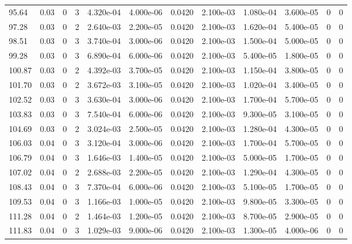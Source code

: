 \documentclass[preview]{standalone}
\begin{document}
{{{{\begin{tabular}{L{1.2cm}C{1.2cm} C{0.3cm}C{0.5cm} C{1.4cm}C{1.4cm} C{1.4cm}C{1.4cm} C{1.6cm}C{1.6cm} C{1.6cm}C{1.6cm}}
  95.64  &  0.03  & 0     &  3 &  4.320e-04  & 4.000e-06  &  0.0420&   2.100e-03& 1.080e-04 & 3.600e-05   &  0 & 0  \\ 
  97.28  &  0.03  & 0     &  2 &  2.640e-03  & 2.200e-05  &  0.0420&   2.100e-03& 1.620e-04 & 5.400e-05   &  0 & 0  \\ 
  98.51  &  0.03  & 0     &  3 &  3.740e-04  & 3.000e-06  &  0.0420&   2.100e-03& 1.500e-04 & 5.000e-05   &  0 & 0  \\ 
  99.28  &  0.03  & 0     &  3 &  6.890e-04  & 6.000e-06  &  0.0420&   2.100e-03& 5.400e-05 & 1.800e-05   &  0 & 0  \\ 
  100.87  &  0.03  & 0     &  2 &  4.392e-03  & 3.700e-05  &  0.0420&   2.100e-03& 1.150e-04 & 3.800e-05   &  0 & 0  \\ 
  101.70  &  0.03  & 0     &  2 &  3.672e-03  & 3.100e-05  &  0.0420&   2.100e-03& 1.020e-04 & 3.400e-05   &  0 & 0  \\ 
  102.52  &  0.03  & 0     &  3 &  3.630e-04  & 3.000e-06  &  0.0420&   2.100e-03& 1.700e-04 & 5.700e-05   &  0 & 0  \\ 
  103.83  &  0.03  & 0     &  3 &  7.540e-04  & 6.000e-06  &  0.0420&   2.100e-03& 9.300e-05 & 3.100e-05   &  0 & 0  \\ 
  104.69  &  0.03  & 0     &  2 &  3.024e-03  & 2.500e-05  &  0.0420&   2.100e-03& 1.280e-04 & 4.300e-05   &  0 & 0  \\ 
  106.03  &  0.04  & 0     &  3 &  3.120e-04  & 3.000e-06  &  0.0420&   2.100e-03& 1.700e-04 & 5.700e-05   &  0 & 0  \\ 
  106.79  &  0.04  & 0     &  3 &  1.646e-03  & 1.400e-05  &  0.0420&   2.100e-03& 5.000e-05 & 1.700e-05   &  0 & 0  \\ 
  107.02  &  0.04  & 0     &  2 &  2.688e-03  & 2.200e-05  &  0.0420&   2.100e-03& 1.290e-04 & 4.300e-05   &  0 & 0  \\ 
  108.43  &  0.04  & 0     &  3 &  7.370e-04  & 6.000e-06  &  0.0420&   2.100e-03& 5.100e-05 & 1.700e-05   &  0 & 0  \\ 
  109.53  &  0.04  & 0     &  3 &  1.166e-03  & 1.000e-05  &  0.0420&   2.100e-03& 9.800e-05 & 3.300e-05   &  0 & 0  \\ 
  111.28  &  0.04  & 0     &  2 &  1.464e-03  & 1.200e-05  &  0.0420&   2.100e-03& 8.700e-05 & 2.900e-05   &  0 & 0  \\ 
  111.83  &  0.04  & 0     &  3 &  1.029e-03  & 9.000e-06  &  0.0420&   2.100e-03& 1.300e-05 & 4.000e-06   &  0 & 0  \\ 
\hline 
\end{tabular} 

}}}}
\end{document}
